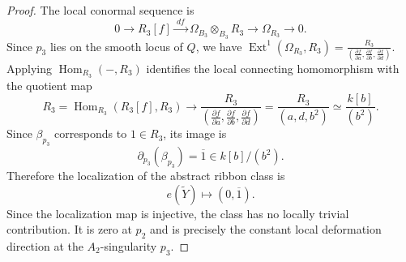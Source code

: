 \documentclass[11pt,twoside]{amsart}
\theoremstyle{plain}
\numberwithin{equation}{section}
\theoremstyle{definition}
\begin{document}
\begin{proof}
The local conormal sequence is
$$
0\longrightarrow R_3[f]
\xrightarrow{\ df\ }
\Omega_{B_3}\otimes_{B_3}R_3
\longrightarrow\Omega_{R_3}
\longrightarrow0.
$$
Since $p_3$ lies on the smooth locus of $Q$, we have $\operatorname{Ext}^1(\Omega_{R_3}, R_3) = \frac{R_3}
{\left(
\frac{\partial f}{\partial a},
\frac{\partial f}{\partial b},
\frac{\partial f}{\partial d}
\right)}$. Applying $\operatorname{Hom}_{R_3}(-,R_3)$ identifies the local connecting homomorphism with the quotient map
$$
R_3=\operatorname{Hom}_{R_3}(R_3[f],R_3)
\longrightarrow
\frac{R_3}
{\left(
\frac{\partial f}{\partial a},
\frac{\partial f}{\partial b},
\frac{\partial f}{\partial d}
\right)}
=
\frac{R_3}{(a,d,b^2)}
\simeq \frac{k[b]}{(b^2)}.
$$
Since $\beta_{p_3}$ corresponds to $1\in R_3$, its image is
$$
\partial_{p_3}(\beta_{p_3})
=\overline{1}
\in k[b]/(b^2).
$$
Therefore the localization of the abstract ribbon class is
$$
e(\widetilde Y)\longmapsto(0,\overline{1}).
$$
Since the localization map is injective, the class has no locally trivial contribution. It is zero at $p_2$ and is precisely the constant local deformation direction at the $A_2$-singularity $p_3$.
\end{proof}
\end{document}
